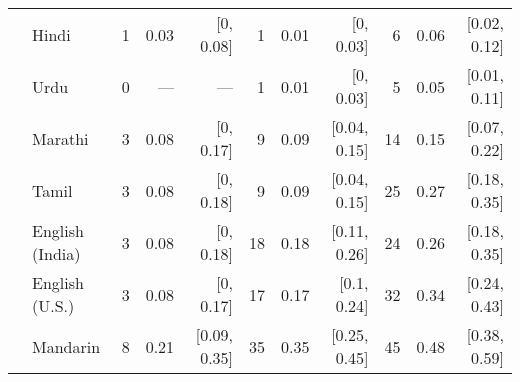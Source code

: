 \begin{table}[t]
\begin{footnotesize}
\begin{tabular}{p{.1in}lrrrrrrrrr}
 & Hindi & 1 & 0.03 & [0, 0.08] & 1 & 0.01 & [0, 0.03] & 6 & 0.06 & [0.02, 0.12]\\

 & Urdu & 0 & --- & --- & 1 & 0.01 & [0, 0.03] & 5 & 0.05 & [0.01, 0.11]\\

 & Marathi & 3 & 0.08 & [0, 0.17] & 9 & 0.09 & [0.04, 0.15] & 14 & 0.15 & [0.07, 0.22]\\

 & Tamil & 3 & 0.08 & [0, 0.18] & 9 & 0.09 & [0.04, 0.15] & 25 & 0.27 & [0.18, 0.35]\\

 & English (India) & 3 & 0.08 & [0, 0.18] & 18 & 0.18 & [0.11, 0.26] & 24 & 0.26 & [0.18, 0.35]\\

 & English (U.S.) & 3 & 0.08 & [0, 0.17] & 17 & 0.17 & [0.1, 0.24] & 32 & 0.34 & [0.24, 0.43]\\

& Mandarin & 8 & 0.21 & [0.09, 0.35] & 35 & 0.35 & [0.25, 0.45] & 45 & 0.48 & [0.38, 0.59]\\

\bottomrule
\end{tabular}
\end{footnotesize}
\end{table}
